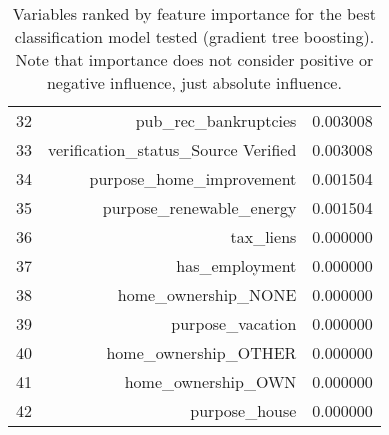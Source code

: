 \begin{table}[!ht]
\begin{tabular}{crc}
32 & pub\_rec\_bankruptcies & 0.003008 \\
33 & verification\_status\_Source Verified & 0.003008 \\
34 & purpose\_home\_improvement & 0.001504 \\
35 & purpose\_renewable\_energy & 0.001504 \\
36 & tax\_liens & 0.000000 \\
37 & has\_employment & 0.000000 \\
38 & home\_ownership\_NONE & 0.000000 \\
39 & purpose\_vacation & 0.000000 \\
40 & home\_ownership\_OTHER & 0.000000 \\
41 & home\_ownership\_OWN & 0.000000 \\
42 & purpose\_house & 0.000000 \\
\bottomrule
\end{tabular}
\caption{Variables ranked by feature importance for the best classification model tested (gradient tree boosting). Note that importance does not consider positive or negative influence, just absolute influence. }
\label{table:classification_importances}
\end{table}